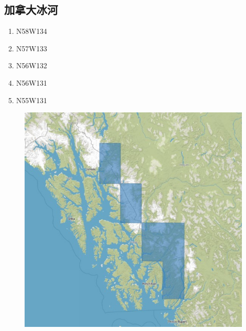 \documentclass[a4paper, 12pt]{article}
\begin{document}
\begin{appendices}
\subsection{加拿大冰河}
\begin{multicols}{3}
\begin{enumerate}
    \item N58W134
    \item N57W133
    \item N56W132
    \item N56W131
    \item N55W131
\end{enumerate}
\end{multicols}
\begin{figure}[H]
    \centering
    \includegraphics[width=0.8\linewidth]{fig/a5.jpg}
\end{figure}
\end{appendices}
\end{document}
